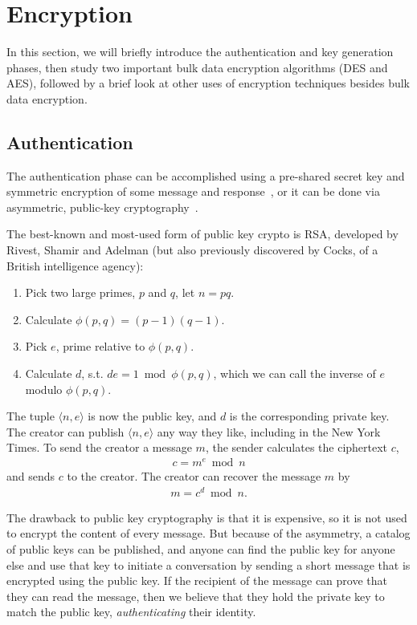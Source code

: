 \section{Encryption}

In this section, we will briefly introduce the authentication and key
generation phases, then study two important bulk data encryption
algorithms (DES and AES), followed by a brief look at other uses of
encryption techniques besides bulk data encryption.

\subsection{Authentication}

The authentication phase can be accomplished using a pre-shared secret
key and symmetric encryption of some message and
response~\cite{needham:encrypt}, or it can be done via
asymmetric, public-key cryptography~\cite{rivest78:_rsa}.

The best-known and most-used form of public key crypto is RSA, developed by Rivest, Shamir and Adelman (but also previously discovered by Cocks, of a British intelligence agency):

\begin{enumerate}
\item Pick two large primes, $p$ and $q$, let $n = pq$.
\item Calculate $\phi(p,q) = (p-1)(q-1)$.
\item Pick $e$, prime relative to $\phi(p,q)$.
\item Calculate $d$, s.t. $de = 1 \bmod \phi(p,q)$,
  which we can call the inverse of $e$ modulo $\phi(p,q)$.
\end{enumerate}

The tuple $\langle n,e\rangle$ is now the public key, and $d$ is the
corresponding private key.  The creator can publish $\langle n,e\rangle$ any
way they like, including in the New York Times. To send the creator a message
$m$, the sender calculates the ciphertext $c$,
\begin{align}
c = m^e \bmod n
\end{align}
and sends $c$ to the creator.  The creator can recover the message $m$
by
\begin{align}
m = c^d \bmod n.
\end{align}

The drawback to public key cryptography is that it is expensive, so it
is not used to encrypt the content of every message.  But because of
the asymmetry, a catalog of public keys can be published, and anyone
can find the public key for anyone else and use that key to initiate a
conversation by sending a short message that is encrypted using the
public key.  If the recipient of the message can prove that they can
read the message, then we believe that they hold the private key to
match the public key, \emph{authenticating} their identity.

